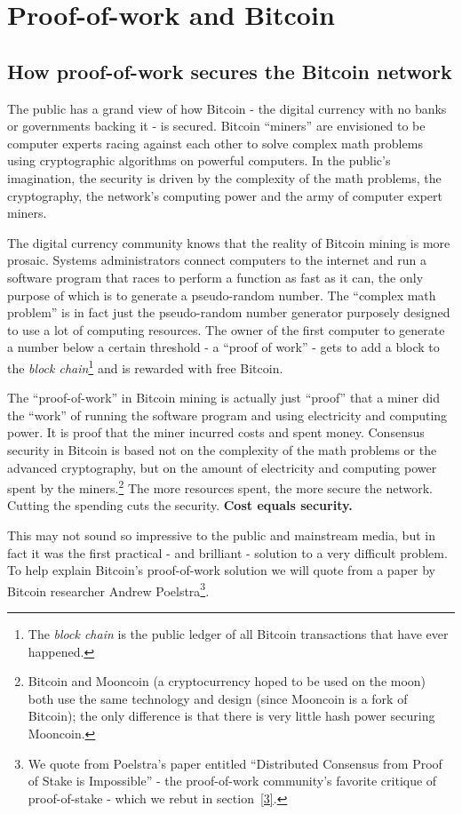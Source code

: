 \documentclass[a4paper,11pt]{article}
\begin{document}
\newpage
\section{Proof-of-work and Bitcoin}
\subsection{How proof-of-work secures the Bitcoin network}

The public has a grand view of how Bitcoin - the digital currency with no banks or governments backing it - is secured. Bitcoin ``miners'' are envisioned to be computer experts racing against each other to solve complex math problems using cryptographic algorithms on powerful computers. In the public's imagination, the security is driven by the complexity of the math problems, the cryptography, the network's computing power and the army of computer expert miners.

The digital currency community knows that the reality of Bitcoin mining is more prosaic. Systems administrators connect computers to the internet and run a software program that races to perform a function as fast as it can, the only purpose of which is to generate a pseudo-random number. The ``complex math problem'' is in fact just the pseudo-random number generator purposely designed to use a lot of computing resources. The owner of the first computer to generate a number below a certain threshold - a ``proof of work'' - gets to add a block to the \textit{\textit{block chain}}\footnote{The \textit{block chain} is the public ledger of all Bitcoin transactions that have ever happened.} and is rewarded with free Bitcoin. 

The ``proof-of-work'' in Bitcoin mining is actually just ``proof'' that a miner did the ``work'' of running the software program and using electricity and computing power. It is proof that the miner incurred costs and spent money. Consensus security in Bitcoin is based not on the complexity of the math problems or the advanced cryptography, but on the amount of electricity and computing power spent by the miners.\footnote{Bitcoin and Mooncoin (a cryptocurrency hoped to be used on the moon) both use the same technology and design (since Mooncoin is a fork of Bitcoin); the only difference is that there is very little hash power securing Mooncoin.} The more resources spent, the more secure the network. Cutting the spending cuts the security. \textbf{Cost equals security.}

This may not sound so impressive to the public and mainstream media, but in fact it was the first practical - and brilliant - solution to a very difficult problem. To help explain Bitcoin's proof-of-work solution we will quote from a paper by Bitcoin researcher Andrew Poelstra\footnote{We quote from Poelstra's paper entitled ``Distributed Consensus from Proof of Stake is Impossible'' - the proof-of-work community's favorite critique of proof-of-stake - which we rebut in section~\ref{3}.}. 
\end{document}
